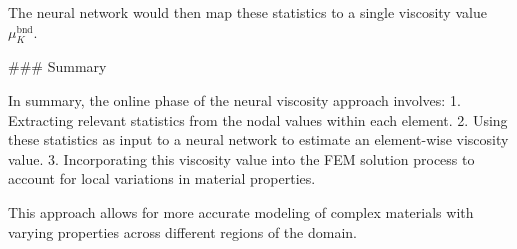 The neural network would then map these statistics to a single viscosity value \( \mu_K^{\text{bnd}} \).

### Summary

In summary, the online phase of the neural viscosity approach involves:
1. Extracting relevant statistics from the nodal values within each element.
2. Using these statistics as input to a neural network to estimate an element-wise viscosity value.
3. Incorporating this viscosity value into the FEM solution process to account for local variations in material properties.

This approach allows for more accurate modeling of complex materials with varying properties across different regions of the domain.